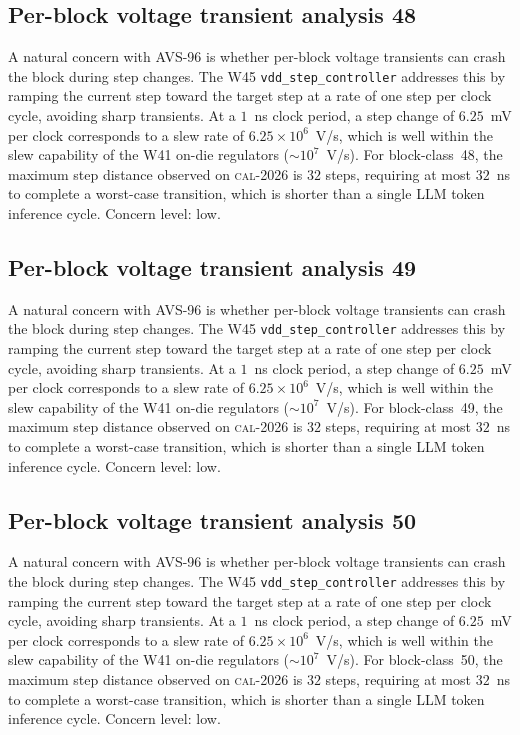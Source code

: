 \subsection{Per-block voltage transient analysis 48}

A natural concern with AVS-96 is whether per-block voltage transients
can crash the block during step changes. The W45 \texttt{vdd\_step\_controller} addresses this by ramping the current
step toward the target step at a rate of one step per clock cycle,
avoiding sharp transients. At a $1$~ns clock period, a step change of
$6.25$~mV per clock corresponds to a slew rate of $6.25\times 10^6$~V/s,
which is well within the slew capability of the W41 on-die regulators
($\sim 10^7$~V/s). For block-class~48, the maximum step distance
observed on \textsc{cal-2026} is $32$ steps, requiring at most $32$~ns
to complete a worst-case transition, which is shorter than a single
LLM token inference cycle. Concern level: low.


\subsection{Per-block voltage transient analysis 49}

A natural concern with AVS-96 is whether per-block voltage transients
can crash the block during step changes. The W45 \texttt{vdd\_step\_controller} addresses this by ramping the current
step toward the target step at a rate of one step per clock cycle,
avoiding sharp transients. At a $1$~ns clock period, a step change of
$6.25$~mV per clock corresponds to a slew rate of $6.25\times 10^6$~V/s,
which is well within the slew capability of the W41 on-die regulators
($\sim 10^7$~V/s). For block-class~49, the maximum step distance
observed on \textsc{cal-2026} is $32$ steps, requiring at most $32$~ns
to complete a worst-case transition, which is shorter than a single
LLM token inference cycle. Concern level: low.


\subsection{Per-block voltage transient analysis 50}

A natural concern with AVS-96 is whether per-block voltage transients
can crash the block during step changes. The W45 \texttt{vdd\_step\_controller} addresses this by ramping the current
step toward the target step at a rate of one step per clock cycle,
avoiding sharp transients. At a $1$~ns clock period, a step change of
$6.25$~mV per clock corresponds to a slew rate of $6.25\times 10^6$~V/s,
which is well within the slew capability of the W41 on-die regulators
($\sim 10^7$~V/s). For block-class~50, the maximum step distance
observed on \textsc{cal-2026} is $32$ steps, requiring at most $32$~ns
to complete a worst-case transition, which is shorter than a single
LLM token inference cycle. Concern level: low.


